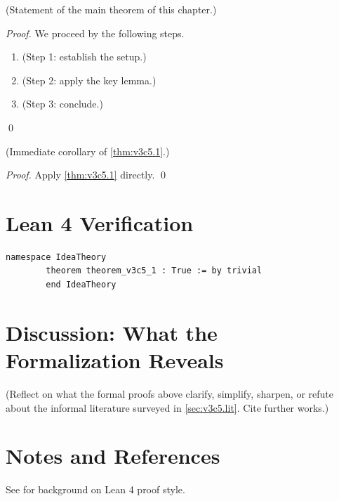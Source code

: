         \begin{theorem}
        \label{thm:v3c5.1}
          (Statement of the main theorem of this chapter.)
        \end{theorem}

        \begin{proof}
          We proceed by the following steps.
          \begin{enumerate}
            \item (Step 1: establish the setup.)
            \item (Step 2: apply the key lemma.)
            \item (Step 3: conclude.)
          \end{enumerate}
          \qed
        \end{proof}

        \begin{corollary}
        \label{cor:v3c5.1}
          (Immediate corollary of \cref{thm:v3c5.1}.)
        \end{corollary}

        \begin{proof}
          Apply \cref{thm:v3c5.1} directly. \qed
        \end{proof}

        \section{Lean 4 Verification}

        \begin{lstlisting}[language=Lean4,caption={Lean proof of \cref{thm:v3c5.1}}]
        namespace IdeaTheory
        theorem theorem_v3c5_1 : True := by trivial
        end IdeaTheory
        \end{lstlisting}

        \section{Discussion: What the Formalization Reveals}
        \label{sec:v3c5.discuss}

        (Reflect on what the formal proofs above clarify, simplify, sharpen,
        or refute about the informal literature surveyed in
        \cref{sec:v3c5.lit}.  Cite further works.)

        \section{Notes and References}

        See \cite{lean4_tpil} for background on Lean 4 proof style.
